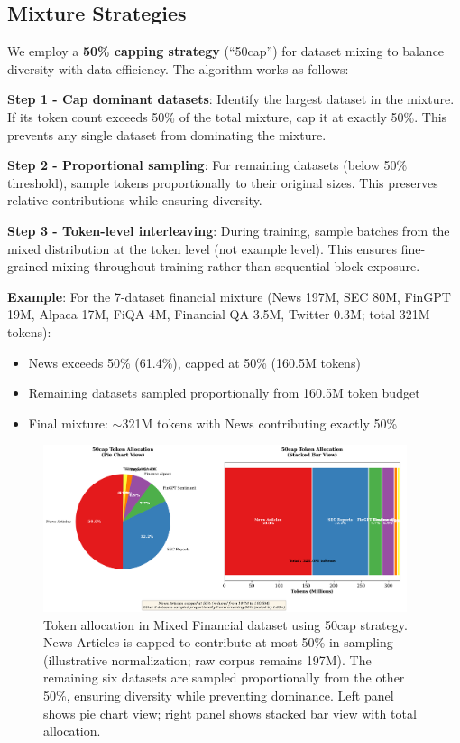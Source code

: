 \subsection{Mixture Strategies}

We employ a \textbf{50\% capping strategy} (``50cap'') for dataset mixing to balance diversity with data efficiency. The algorithm works as follows:

\textbf{Step 1 - Cap dominant datasets}: Identify the largest dataset in the mixture. If its token count exceeds 50\% of the total mixture, cap it at exactly 50\%. This prevents any single dataset from dominating the mixture.

\textbf{Step 2 - Proportional sampling}: For remaining datasets (below 50\% threshold), sample tokens proportionally to their original sizes. This preserves relative contributions while ensuring diversity.

\textbf{Step 3 - Token-level interleaving}: During training, sample batches from the mixed distribution at the token level (not example level). This ensures fine-grained mixing throughout training rather than sequential block exposure.

\textbf{Example}: For the 7-dataset financial mixture (News 197M, SEC 80M, FinGPT 19M, Alpaca 17M, FiQA 4M, Financial QA 3.5M, Twitter 0.3M; total 321M tokens):
\begin{itemize}
\item News exceeds 50\% (61.4\%), capped at 50\% (160.5M tokens)
\item Remaining datasets sampled proportionally from 160.5M token budget
\item Final mixture: $\sim$321M tokens with News contributing exactly 50\%
\end{itemize}

\begin{figure}[h]
\centering
\includegraphics[width=0.95\textwidth]{figures/diagram_50cap.png}
\caption[50cap Mixture Strategy Visualization]{Token allocation in Mixed Financial dataset using 50cap strategy. News Articles is capped to contribute at most 50\% in sampling (illustrative normalization; raw corpus remains 197M). The remaining six datasets are sampled proportionally from the other 50\%, ensuring diversity while preventing dominance. Left panel shows pie chart view; right panel shows stacked bar view with total allocation.}
\label{fig:diagram_50cap}
\end{figure}

